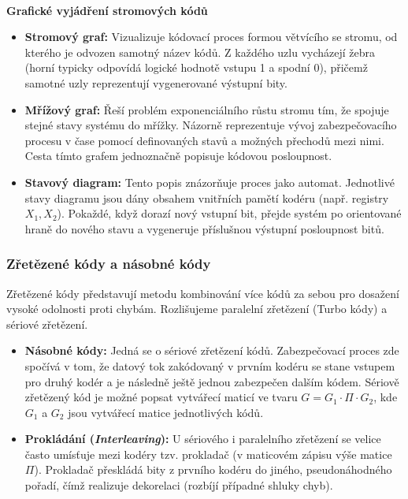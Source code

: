         \paragraph{}
        \textbf{Grafické vyjádření stromových kódů}
        
        \begin{itemize}
            \item \textbf{Stromový graf:} Vizualizuje kódovací proces formou větvícího se stromu, od kterého je odvozen samotný název kódů. Z každého uzlu vycházejí žebra (horní typicky odpovídá logické hodnotě vstupu 1 a spodní 0), přičemž samotné uzly reprezentují vygenerované výstupní bity.
            \item \textbf{Mřížový graf:} Řeší problém exponenciálního růstu stromu tím, že spojuje stejné stavy systému do mřížky. Názorně reprezentuje vývoj zabezpečovacího procesu v čase pomocí definovaných stavů a možných přechodů mezi nimi. Cesta tímto grafem jednoznačně popisuje kódovou posloupnost. 
            \item \textbf{Stavový diagram:} Tento popis znázorňuje proces jako automat. Jednotlivé stavy diagramu jsou dány obsahem vnitřních pamětí kodéru (např. registry $X_1, X_2$). Pokaždé, když dorazí nový vstupní bit, přejde systém po orientované hraně do nového stavu a vygeneruje příslušnou výstupní posloupnost bitů.
        \end{itemize}
    \subsubsection{Zřetězené kódy a násobné kódy}
        Zřetězené kódy představují metodu kombinování více kódů za sebou pro dosažení vysoké odolnosti proti chybám. Rozlišujeme paralelní zřetězení (Turbo kódy) a sériové zřetězení.
        \begin{itemize}
            \item \textbf{Násobné kódy:} Jedná se o sériové zřetězení kódů. Zabezpečovací proces zde spočívá v tom, že datový tok zakódovaný v prvním kodéru se stane vstupem pro druhý kodér a je následně ještě jednou zabezpečen dalším kódem. Sériově zřetězený kód je možné popsat vytvářecí maticí ve tvaru $G = G_1 \cdot \Pi \cdot G_2$, kde $G_1$ a $G_2$ jsou vytvářecí matice jednotlivých kódů.
            \item \textbf{Prokládání (\textit{Interleaving}):} U sériového i paralelního zřetězení se velice často umísťuje mezi kodéry tzv. prokladač (v maticovém zápisu výše matice $\Pi$). Prokladač přeskládá bity z prvního kodéru do jiného, pseudonáhodného pořadí, čímž realizuje dekorelaci (rozbíjí případné shluky chyb).
        \end{itemize}
